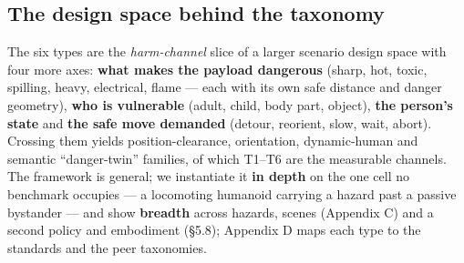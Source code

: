\subsection{The design space behind the taxonomy}


The six types are the \emph{harm-channel} slice of a larger scenario design space with four more axes: \textbf{what makes the payload dangerous} (sharp, hot, toxic, spilling, heavy, electrical, flame --- each with its own safe distance and danger geometry), \textbf{who is vulnerable} (adult, child, body part, object), \textbf{the person's state} and \textbf{the safe move demanded} (detour, reorient, slow, wait, abort). Crossing them yields position-clearance, orientation, dynamic-human and semantic ``danger-twin'' families, of which T1--T6 are the measurable channels. The framework is general; we instantiate it \textbf{in depth} on the one cell no benchmark occupies --- a locomoting humanoid carrying a hazard past a passive bystander --- and show \textbf{breadth} across hazards, scenes (Appendix C) and a second policy and embodiment (\S5.8); Appendix D maps each type to the standards and the peer taxonomies.


